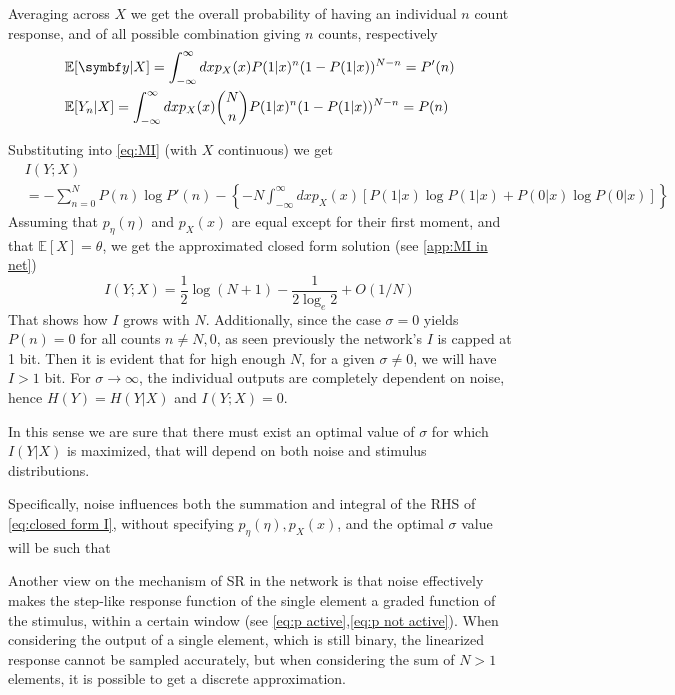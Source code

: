 Averaging across $X$ we get the overall probability of having an individual $n$ count response, and of all possible combination giving $n$ counts, respectively
\begin{align}
    &\mathbb{E}[\vb{y}|X] = \int_{-\infty}^{\infty} dxp_X(x) P(1|x)^n(1-P(1|x))^{N-n} = P'(n)\\
    &\mathbb{E}[Y_n|X] = \int_{-\infty}^{\infty} dx p_X(x) \binom{N}{n} P(1|x)^n(1-P(1|x))^{N-n} = P(n)
\end{align}

Substituting into \ref{eq:MI} (with $X$ continuous) we get
\begin{align}
    \label{eq:closed form I}
    &I(Y;X)\\
    &= - \sum_{n=0}^N P(n) \log P'(n) -\left\{- N \int_{-\infty}^{\infty} dx p_X(x)\left[ P(1|x) \log P(1|x) + P(0|x)\log P(0|x)\right]\right\}
\end{align}
Assuming that $p_\eta(\eta)$ and $p_X(x)$ are equal except for their first moment, and that $\mathbb{E}[X] = \theta$, we get the approximated closed form solution (see \ref{app:MI in net})
\begin{equation}
    I(Y;X)= \frac{1}{2}\log(N+1)-\frac{1}{2\log_e 2} + O(1/N)
\end{equation}
That shows how $I$ grows with $N$. 
Additionally, since the case $\sigma=0$ yields $P(n) = 0$ for all counts $n\neq N,0$, as seen previously the network's $I$ is capped at 1 bit. 
Then it is evident that for high enough $N$, for a given $\sigma \neq0$, we will have $I>1$ bit. 
For $\sigma \to \infty$, the individual outputs are completely dependent on noise, hence $H(Y) = H(Y|X)$ and $I(Y;X) = 0$.

In this sense we are sure that there must exist an optimal value of $\sigma$ for which $I(Y|X)$ is maximized, that will depend on both noise and stimulus distributions.

Specifically, noise influences both the summation and integral of the RHS of \ref{eq:closed form I}, without specifying $p_\eta(\eta),p_X(x)$, and the optimal $\sigma$ value will be such that

Another view on the mechanism of SR in the network is that noise effectively makes the step-like response function of the single element a graded function of the stimulus, within a certain window (see \ref{eq:p active},\ref{eq:p not active}). 
When considering the output of a single element, which is still binary, the linearized response cannot be sampled accurately, but when considering the sum of $N>1$ elements, it is possible to get a discrete approximation. %

